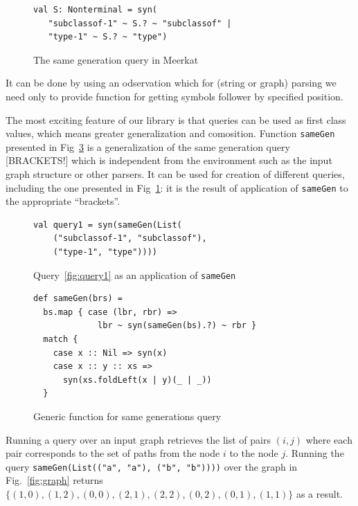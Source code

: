 \begin{figure}[h]
\begin{lstlisting}
val S: Nonterminal = syn(
   "subclassof-1" ~ S.? ~ "subclassof" |
   "type-1" ~ S.? ~ "type")
\end{lstlisting}
\caption{The same generation query in Meerkat}
\label{fig:query1Meerkat}
\end{figure}


It can be done by using an odservation which for (string or graph) parsing we need only to provide function for getting symbols follower by specified position.

The most exciting feature of our library is that queries can be used as first class values, which means greater generalization and comosition. 
Function \lstinline{sameGen} presented in Fig~\ref{fig:gen} is a generalization of the same generation query [BRACKETS!] which is independent from the environment such as the input graph structure or other parsers. It can be used for creation of different queries, including the one presented in Fig~\ref{fig:query1Meerkat}: it is the result of application of \lstinline{sameGen} to the appropriate ``brackets''.

\begin{figure}[h]
\begin{lstlisting}
val query1 = syn(sameGen(List(
    ("subclassof-1", "subclassof"),
    ("type-1", "type"))))
\end{lstlisting}
\caption{Query~\ref{fig:query1} as an application of \lstinline{sameGen}}
\label{fig:query1Gen}
\end{figure}

\begin{figure}[h]
\begin{lstlisting}
def sameGen(brs) =
  bs.map { case (lbr, rbr) => 
             lbr ~ syn(sameGen(bs).?) ~ rbr } 
  match {
    case x :: Nil => syn(x)
    case x :: y :: xs => 
      syn(xs.foldLeft(x | y)(_ | _))
  }
\end{lstlisting}
\caption{Generic function for same generations query}
\label{fig:gen}
\end{figure}

Running a query over an input graph retrieves the list of pairs $(i, j)$ where each pair corresponds to the set of paths from the node $i$ to the node $j$. Running the query \lstinline{sameGen(List(("a", "a"), ("b", "b"))))} over the graph in Fig.~\ref{fig:graph} returns  $\{(1,0), (1,2), (0,0), (2,1), (2,2), (0,2), (0,1), (1,1)\}$ as a result. 


